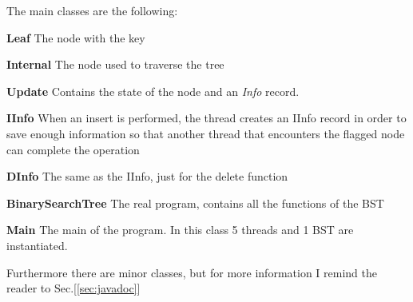 \documentclass[a4paper]{article}
\begin{document}
\noindent
The main classes are the following:
\begin{compactitem}
  \item \textbf{Leaf} The node with the key
  \item \textbf{Internal} The node used to traverse the tree
  \item \textbf{Update} Contains the state of the node and an \emph{Info} record.
  \item \textbf{IInfo} When an insert is performed, the thread creates an IInfo record in order to save enough information so that another thread that encounters the flagged node can complete the operation
  \item \textbf{DInfo} The same as the IInfo, just for the delete function
  \item \textbf{BinarySearchTree} The real program, contains all the functions of the \ac{BST}
  \item \textbf{Main} The main of the program. In this class 5 threads and 1 \ac{BST} are instantiated.
\end{compactitem}

\noindent

Furthermore there are minor classes, but for more information I remind the reader to Sec.[\ref{sec:javadoc}]
\end{document}
